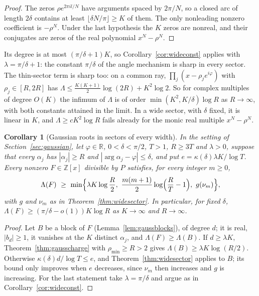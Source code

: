 \documentclass[11pt]{article}
\newtheorem{corollary}[theorem]{Corollary}
\newcommand{\R}{\mathbb R}
\begin{document}
\begin{proof}
The zeros $\rho e^{2\pi il/N}$ have arguments spaced by $2\pi/N$, so a closed
arc of length $2\delta$ contains at least $\lfloor\delta N/\pi\rfloor\ge K$ of
them.  The only nonleading nonzero coefficient is $-\rho^N$.  Under the last
hypothesis the $K$ zeros are nonreal, and their conjugates are zeros of the
real polynomial $x^N-\rho^N$.
\end{proof}

Its degree is at most $(\pi/\delta+1)K$, so Corollary~\ref{cor:wideconst}
applies with $\lambda=\pi/\delta+1$: the constant $\pi/\delta$ of the angle
mechanism is sharp in every sector.  The thin-sector term is sharp too: on a
common ray, $\prod_j(x-\rho_je^{i\varphi})$ with $\rho_j\in[R,2R]$ has
$\Lambda\le\frac{K(K+1)}2\log(2R)+K^2\log2$.  So for complex multiples of
degree $O(K)$ the infimum of $\Lambda$ is of order $\min(K^2,K/\delta)\log R$
as $R\to\infty$, with both constants attained in the limit.  In a wide sector, with $\delta$
fixed, it is linear in $K$, and
$\Lambda\ge cK^2\log R$ fails already for the monic real multiple $x^N-\rho^N$.
\begin{corollary}[Gaussian roots in sectors of every width]\label{cor:widegauss}
In the setting of Section~\ref{sec:gaussian}, let $\varphi\in\R$,
$0<\delta<\pi/2$, $T>1$, $R\ge3T$ and $\lambda>0$, suppose that every
$\alpha_j$ has $|\alpha_j|\ge R$ and $|\arg\alpha_j-\varphi|\le\delta$, and put
$e=\kappa(\delta)\lambda K/\log T$.  Every nonzero $F\in\mathbb Z[x]$ divisible
by $P$ satisfies, for every integer $m\ge0$,
\[
  \Lambda(F)\ \ge\ \min\Bigl\{\lambda K\log\frac R2,\
  \frac{m(m+1)}2\log\Bigl(\frac RT-1\Bigr),\ g(\nu_m)\Bigr\},
\]
with $g$ and $\nu_m$ as in Theorem~\ref{thm:widesector}.  In particular, for fixed
$\delta$, $\Lambda(F)\ge(\pi/\delta-o(1))K\log R$ as $K\to\infty$ and
$R\to\infty$.
\end{corollary}

\begin{proof}
Let $B$ be a block of $F$ (Lemma~\ref{lem:gaussblocks}), of degree $d$; it is
real, $|b_d|\ge1$, it vanishes at the $K$ distinct $\alpha_j$, and
$\Lambda(F)\ge\Lambda(B)$.  If $d\ge\lambda K$, Theorem~\ref{thm:gausscharge}
with $\rho_{\min}\ge R>2$ gives $\Lambda(B)\ge\lambda K\log(R/2)$.  Otherwise
$\kappa(\delta)d/\log T\le e$, and Theorem~\ref{thm:widesector} applies to $B$;
its bound only improves when $e$ decreases, since $\nu_m$ then
increases and $g$ is increasing.  For the last statement take
$\lambda=\pi/\delta$ and argue as in Corollary~\ref{cor:wideconst}.
\end{proof}
\end{document}
